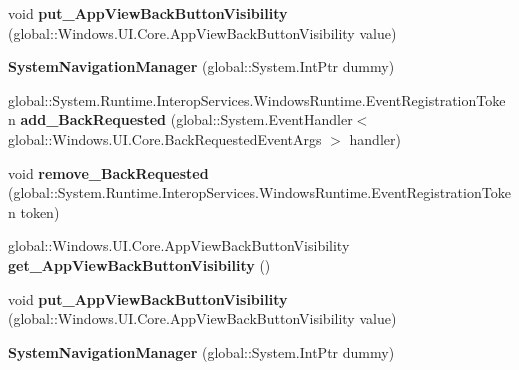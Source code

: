 \begin{DoxyCompactItemize}
\item 
\mbox{\label{class_windows_1_1_u_i_1_1_core_1_1_system_navigation_manager_afe04efb626cf6de6a695ea8debc94023}} 
void {\bfseries put\+\_\+\+App\+View\+Back\+Button\+Visibility} (global\+::\+Windows.\+U\+I.\+Core.\+App\+View\+Back\+Button\+Visibility value)
\item 
\mbox{\label{class_windows_1_1_u_i_1_1_core_1_1_system_navigation_manager_ae4d0015a9d24d73ac2ebcf8019f386b2}} 
{\bfseries System\+Navigation\+Manager} (global\+::\+System.\+Int\+Ptr dummy)
\item 
\mbox{\label{class_windows_1_1_u_i_1_1_core_1_1_system_navigation_manager_a505f794c14a0da8cd15a31aa6273a6d7}} 
global\+::\+System.\+Runtime.\+Interop\+Services.\+Windows\+Runtime.\+Event\+Registration\+Token {\bfseries add\+\_\+\+Back\+Requested} (global\+::\+System.\+Event\+Handler$<$ global\+::\+Windows.\+U\+I.\+Core.\+Back\+Requested\+Event\+Args $>$ handler)
\item 
\mbox{\label{class_windows_1_1_u_i_1_1_core_1_1_system_navigation_manager_abf606a807ad7581e8b10c99338d9221a}} 
void {\bfseries remove\+\_\+\+Back\+Requested} (global\+::\+System.\+Runtime.\+Interop\+Services.\+Windows\+Runtime.\+Event\+Registration\+Token token)
\item 
\mbox{\label{class_windows_1_1_u_i_1_1_core_1_1_system_navigation_manager_a3aa076218316c5f742b0c8611394df04}} 
global\+::\+Windows.\+U\+I.\+Core.\+App\+View\+Back\+Button\+Visibility {\bfseries get\+\_\+\+App\+View\+Back\+Button\+Visibility} ()
\item 
\mbox{\label{class_windows_1_1_u_i_1_1_core_1_1_system_navigation_manager_afe04efb626cf6de6a695ea8debc94023}} 
void {\bfseries put\+\_\+\+App\+View\+Back\+Button\+Visibility} (global\+::\+Windows.\+U\+I.\+Core.\+App\+View\+Back\+Button\+Visibility value)
\item 
\mbox{\label{class_windows_1_1_u_i_1_1_core_1_1_system_navigation_manager_ae4d0015a9d24d73ac2ebcf8019f386b2}} 
{\bfseries System\+Navigation\+Manager} (global\+::\+System.\+Int\+Ptr dummy)
\end{DoxyCompactItemize}
